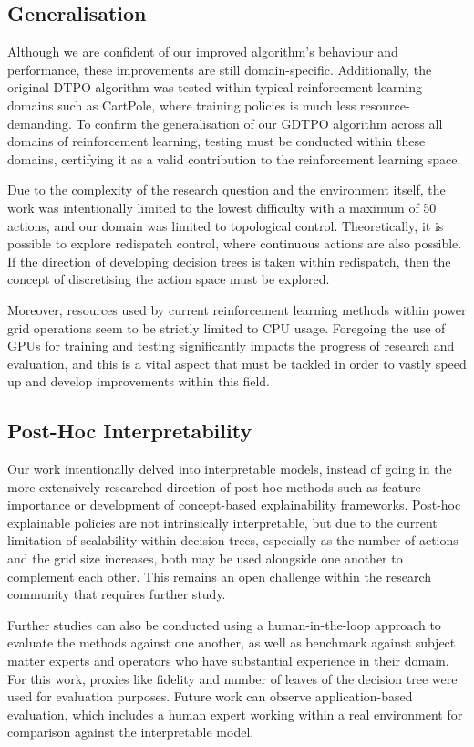 \subsection{Generalisation}

Although we are confident of our improved algorithm's behaviour and performance, these improvements are still domain-specific. Additionally, the original DTPO algorithm was tested within typical reinforcement learning domains such as CartPole, where training policies is much less resource-demanding. To confirm the generalisation of our GDTPO algorithm across all domains of reinforcement learning, testing must be conducted within these domains, certifying it as a valid contribution to the reinforcement learning space.

Due to the complexity of the research question and the environment itself, the work was intentionally limited to the lowest difficulty with a maximum of 50 actions, and our domain was limited to topological control. Theoretically, it is possible to explore redispatch control, where continuous actions are also possible. If the direction of developing decision trees is taken within redispatch, then the concept of discretising the action space must be explored.

Moreover, resources used by current reinforcement learning methods within power grid operations seem to be strictly limited to CPU usage. Foregoing the use of GPUs for training and testing significantly impacts the progress of research and evaluation, and this is a vital aspect that must be tackled in order to vastly speed up and develop improvements within this field.

\subsection{Post-Hoc Interpretability}

Our work intentionally delved into interpretable models, instead of going in the more extensively researched direction of post-hoc methods such as feature importance or development of concept-based explainability frameworks. Post-hoc explainable policies are not intrinsically interpretable, but due to the current limitation of scalability within decision trees, especially as the number of actions and the grid size increases, both may be used alongside one another to complement each other. This remains an open challenge within the research community that requires further study. 

Further studies can also be conducted using a human-in-the-loop approach to evaluate the methods against one another, as well as benchmark against subject matter experts and operators who have substantial experience in their domain. For this work, proxies like fidelity and number of leaves of the decision tree were used for evaluation purposes. Future work can observe application-based evaluation, which includes a human expert working within a real environment for comparison against the interpretable model.

